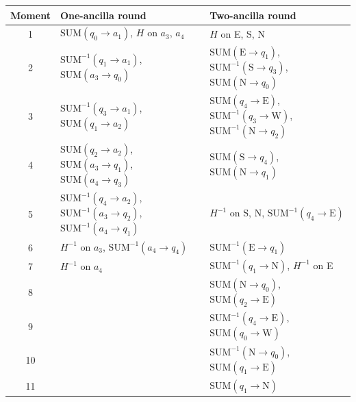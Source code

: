 \begin{table}[tb]
  \centering
  \footnotesize
  \setlength{\tabcolsep}{4pt}
  \begin{tabular}{c|l|l}
    \hline
    Moment & One-ancilla round & Two-ancilla round \\
    \hline
    1 & $\mathrm{SUM}(q_0 \to a_1)$, $H$ on $a_3$, $a_4$ & $H$ on E, S, N \\
    2 & $\mathrm{SUM}^{-1}(q_1 \to a_1)$, $\mathrm{SUM}(a_3 \to q_0)$ & $\mathrm{SUM}(\mathrm{E} \to q_1)$, $\mathrm{SUM}^{-1}(\mathrm{S} \to q_3)$, $\mathrm{SUM}(\mathrm{N} \to q_0)$ \\
    3 & $\mathrm{SUM}^{-1}(q_3 \to a_1)$, $\mathrm{SUM}(q_1 \to a_2)$ & $\mathrm{SUM}(q_4 \to \mathrm{E})$, $\mathrm{SUM}^{-1}(q_3 \to \mathrm{W})$, $\mathrm{SUM}^{-1}(\mathrm{N} \to q_2)$ \\
    4 & $\mathrm{SUM}(q_2 \to a_2)$, $\mathrm{SUM}(a_3 \to q_1)$, $\mathrm{SUM}(a_4 \to q_3)$ & $\mathrm{SUM}(\mathrm{S} \to q_4)$, $\mathrm{SUM}(\mathrm{N} \to q_1)$ \\
    5 & $\mathrm{SUM}^{-1}(q_4 \to a_2)$, $\mathrm{SUM}^{-1}(a_3 \to q_2)$, $\mathrm{SUM}^{-1}(a_4 \to q_1)$ & $H^{-1}$ on S, N, $\mathrm{SUM}^{-1}(q_4 \to \mathrm{E})$ \\
    6 & $H^{-1}$ on $a_3$, $\mathrm{SUM}^{-1}(a_4 \to q_4)$ & $\mathrm{SUM}^{-1}(\mathrm{E} \to q_1)$ \\
    7 & $H^{-1}$ on $a_4$ & $\mathrm{SUM}^{-1}(q_1 \to \mathrm{N})$, $H^{-1}$ on E \\
    8 & & $\mathrm{SUM}(\mathrm{N} \to q_0)$, $\mathrm{SUM}(q_2 \to \mathrm{E})$ \\
    9 & & $\mathrm{SUM}^{-1}(q_4 \to \mathrm{E})$, $\mathrm{SUM}(q_0 \to \mathrm{W})$ \\
    10 & & $\mathrm{SUM}^{-1}(\mathrm{N} \to q_0)$, $\mathrm{SUM}(q_1 \to \mathrm{E})$ \\
    11 & & $\mathrm{SUM}(q_1 \to \mathrm{N})$ \\
    \hline
  \end{tabular}

\end{table}

